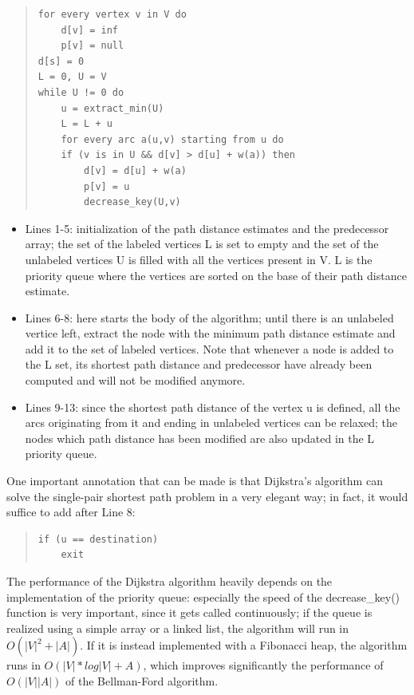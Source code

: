 \documentclass[10pt,a4paper]{report}
\begin{document}
\begin{quote}
\begin{lstlisting}
for every vertex v in V do
    d[v] = inf
    p[v] = null
d[s] = 0
L = 0, U = V
while U != 0 do
    u = extract_min(U)
    L = L + u
    for every arc a(u,v) starting from u do
    if (v is in U && d[v] > d[u] + w(a)) then
        d[v] = d[u] + w(a)
        p[v] = u
        decrease_key(U,v)
\end{lstlisting}
\end{quote}

\begin{itemize}
\item Lines 1-5: initialization of the path distance estimates and the
  predecessor array; the set of the labeled vertices L is set to empty
  and the set of the unlabeled vertices U is filled with all the
  vertices present in V. L is the priority queue where the vertices
  are sorted on the base of their path distance estimate.
\item Lines 6-8: here starts the body of the algorithm; until there is
  an unlabeled vertice left, extract the node with the minimum path
  distance estimate and add it to the set of labeled vertices. Note
  that whenever a node is added to the L set, its shortest path
  distance and predecessor have already been computed and will not be
  modified anymore.
\item Lines 9-13: since the shortest path distance of the vertex u is
  defined, all the arcs originating from it and ending in unlabeled
  vertices can be relaxed; the nodes which path distance has been
  modified are also updated in the L priority queue.
\end{itemize}

One important annotation that can be made is that Dijkstra's algorithm
can solve the single-pair shortest path problem in a very elegant way;
in fact, it would suffice to add after Line 8:
\begin{quote}
\begin{verbatim}
if (u == destination)
    exit
\end{verbatim}
\end{quote}

The performance of the Dijkstra algorithm heavily depends on the
implementation of the priority queue: especially the speed of the
decrease\_key() function is very important, since it gets called
continuously; if the queue is realized using a simple array or a
linked list, the algorithm will run in \(O(|V|^2+|A|)\). If it is
instead implemented with a Fibonacci heap, the algorithm runs in
\(O(|V|*log|V| + A)\), which improves significantly the performance of
\(O(|V||A|)\) of the Bellman-Ford algorithm.
\end{document}
